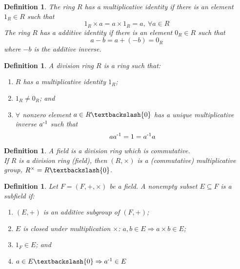 \documentclass[a4paper,8pt]{article}
\theoremstyle{theorem}
\newtheorem{definition}[theorem]{Definition}
\begin{document}
\begin{definition}
The ring $R$ has a \textit{{\color{blue} multiplicative identity}} if there is an element $1_R \in R$ such that 
\begin{equation}
1_R \times a = a \times 1_R = a, \ \forall a \in R
\nonumber
\end{equation}
The ring $R$ has a \textit{{\color{blue} additive identity}} if there is an element $0_R \in R$ such that 
\begin{equation}
a-b = a+(-b) = 0_R
\nonumber
\end{equation}
where $-b$ is the \textit{{\color{blue} additive inverse}}.\\
\end{definition}


\begin{definition}
A \textit{{\color{blue} division ring}} $R$ is a ring such that:
\begin{enumerate}[label=(\roman*)]
\item $R$ has a multiplicative identity $1_R$;
\item $1_R \neq 0_R$; and
\item $\forall$ nonzero element $a \in R \textbackslash \{0\}$ has a unique multiplicative inverse $a \textsuperscript{-1}$ such that
\begin{equation}
aa \textsuperscript{-1} = 1 = a \textsuperscript{-1} a
\nonumber
\end{equation}
\end{enumerate}
\end{definition}


\begin{definition}
A \textit{{\color{blue} field}} is a division ring which is commutative.\\
If $R$ is a division ring (field), then $(R, \times)$ is a (commutative) \textit{{\color{blue} multiplicative group}}, $R^\times = R \textbackslash \{0\}$.\\
\end{definition}


\begin{definition}
Let $F = (F, +, \times) $ be a field. A nonempty subset $E \subseteq F$ is a \textit{{\color{blue} subfield}} if:
\begin{enumerate}[label=(\roman*)]
\item $(E, +)$ is an additive subgroup of $(F, +)$;
\item $E$ is closed under multiplication $\times$: $a, b \in E \Rightarrow a \times b \in E$;
\item $1_F \in E$; and
\item $a \in E \textbackslash \{0\} \Rightarrow a \textsuperscript{-1} \in E$
\end{enumerate}
\end{definition}
\end{document}
